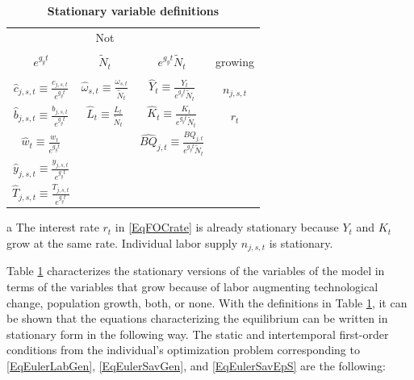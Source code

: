 \documentclass[letterpaper,12pt]{article}
\theoremstyle{definition}
\begin{document}
\begin{spacing}{1.5}
    \begin{table}[htbp] \centering \captionsetup{width=3.3in}
    \caption{\label{TabStatVars}\textbf{Stationary variable definitions}}
      \begin{threeparttable}
      \begin{tabular}{>{\small}c >{\small}c >{\small}c |>{\small}c}
        \hline\hline
        \multicolumn{3}{c}{Sources of growth} & Not \\
        & & & \\[-4mm]
        $e^{g_y t}$ & $\tilde{N}_t$ & $e^{g_y t}\tilde{N}_t$ & growing\tnote{a} \\
        \hline
        & & \\[-4mm]
        $\hat{c}_{j,s,t}\equiv\frac{c_{j,s,t}}{e^{g_y t}}$ & $\hat{\omega}_{s,t}\equiv\frac{\omega_{s,t}}{\tilde{N}_t}$ & $\hat{Y}_t\equiv\frac{Y_t}{e^{g_y t}\tilde{N}_t}$ & $n_{j,s,t}$ \\[2mm]
        $\hat{b}_{j,s,t}\equiv\frac{b_{j,s,t}}{e^{g_y t}}$ & $\hat{L}_t\equiv\frac{L_t}{\tilde{N}_t}$ & $\hat{K}_t\equiv\frac{K_t}{e^{g_y t}\tilde{N}_t}$ & $r_t$ \\[2mm]
        $\hat{w}_t\equiv\frac{w_t}{e^{g_y t}}$ &  & $\hat{BQ}_{j,t}\equiv\frac{BQ_{j,t}}{e^{g_y t}\tilde{N}_t}$ &  \\[2mm]
        $\hat{y}_{j,s,t}\equiv\frac{y_{j,s,t}}{e^{g_y t}}$ &  &  &  \\[2mm]
        $\hat{T}_{j,s,t}\equiv\frac{T_{j,s,t}}{e^{g_y t}}$ &  &  &  \\[2mm]
        \hline\hline
      \end{tabular}
      \begin{tablenotes}
        \scriptsize{\item[a]The interest rate $r_t$ in \eqref{EqFOCrate} is already stationary because $Y_t$ and $K_t$ grow at the same rate. Individual labor supply $n_{j,s,t}$ is stationary.}
      \end{tablenotes}
      \end{threeparttable}
    \end{table}

    Table \ref{TabStatVars} characterizes the stationary versions of the variables of the model in terms of the variables that grow because of labor augmenting technological change, population growth, both, or none. With the definitions in Table \ref{TabStatVars}, it can be shown that the equations  characterizing the equilibrium can be written in stationary form in the following way. The static and intertemporal first-order conditions from the individual's optimization problem corresponding to \eqref{EqEulerLabGen}, \eqref{EqEulerSavGen}, and \eqref{EqEulerSavEpS} are the following:


\end{spacing}
\end{document}
